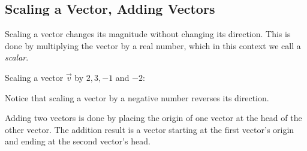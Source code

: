 \subsection{Scaling a Vector, Adding Vectors}
\newcommand{\vecu}{
  \color{col1}{\vec{u}}\color{black}
}
\newcommand{\vecv}{
  \color{col2}{\vec{v}}\color{black}
}
\newcommand{\vecw}{
  \color{col3}{\vec{w}}\color{black}
}
Scaling a vector changes its magnitude without changing its direction. This is done by multiplying the vector by a real number, which in this context we call a \emph{scalar}.
\begin{example}
  Scaling a vector $\vec{v}$ by $2,3,-1$ and $-2$:
  \begin{figure}[H]
  \centering
  \end{figure}
\end{example}
\begin{warning}
  Notice that scaling a vector by a negative number reverses its direction.
\end{warning}
Adding two vectors is done by placing the origin of one vector at the head of the other vector. The addition result is a vector starting at the first vector's origin and ending at the second vector's head.

